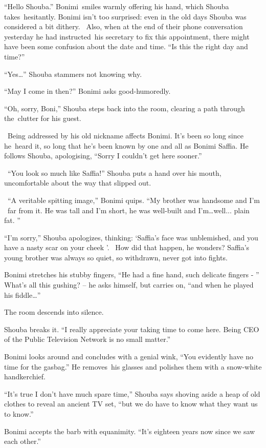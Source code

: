 \documentclass[twoside,11pt]{book}
\begin{document}
``Hello Shouba.'' Bonimi~smiles warmly offering his hand, which Shouba takes~hesitantly.
Bonimi isn't too surprised: even in the old days Shouba was considered a bit dithery. \ Also, when at the end of their
phone conversation yesterday he had instructed~his secretary to fix this appointment, there might have been some
confusion about the date and time. ``Is this the right day and time?''

``Yes{\dots}'' Shouba stammers not knowing why.

``May I come in then?'' Bonimi asks good-humoredly.

``Oh, sorry, Boni,'' Shouba steps back into the room, clearing a path through the~clutter for
his guest.

~Being addressed by his old nickname affects Bonimi. It's been so long since he~heard it, so long that he's been known
by{ }one and all as Bonimi Saffia. He follows Shouba, apologising, ``Sorry I
couldn't get here sooner.''

~``You look so much like Saffia!'' Shouba puts a hand over his mouth, uncomfortable about the
way that slipped out.

~``A veritable spitting image,'' Bonimi quips. ``My brother was handsome and I'm
~far from it. He was tall and I'm short, he was well-built and I'm{\dots}well... plain fat. ''

``I'm sorry,'' Shouba apologizes, thinking: `Saffia's face was unblemished,
and{ }you have a nasty scar on your cheek '. \ How did that happen, he wonders?
Saffia's young brother was always so quiet, so withdrawn, never got into fights.

Bonimi stretches his stubby fingers, ``He had a fine hand, such delicate fingers - '' What's
all this gushing? -- he asks himself, but carries on, ``and when he played his
fiddle{\dots}''

The room descends into silence.

Shouba breaks it. ``I really appreciate your taking time to come here. Being CEO of the Public Television
Network is no small matter.''

Bonimi looks around and concludes with a genial wink, ``You evidently have no time for the
gasbag.'' He removes~his glasses and polishes them with a snow-white handkerchief.

``It's true I don't have much spare time,'' Shouba says shoving aside a heap of old clothes to
reveal an ancient TV set, ``but we do have to know what they want us to know.''

Bonimi accepts the barb with equanimity. ``It's eighteen years now since we saw each other.''
\end{document}
